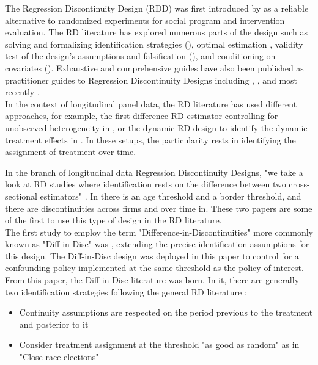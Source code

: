\documentclass[12pt]{article}
\theoremstyle{plain}
\theoremstyle{remark}
\begin{document}
The Regression Discontinuity Design (RDD) was first introduced by \textcite{Thistlewaite1960} as a reliable alternative to randomized experiments for social program and intervention evaluation. The RD literature has explored numerous parts of the design such as solving and formalizing identification strategies (\cite{Hahn2001}), optimal estimation \parencite{Porter2003}, validity test of the design's assumptions and falsification (\cite{McCrary2008}), and conditioning on covariates (\cite{Frolich2007}). Exhaustive and comprehensive guides have also been published as practitioner guides to Regression Discontinuity Designs including \textcite{Imbens2008}, \textcite{VanDerKlaauw2008}, \textcite{Lee2010} and most recently \textcite{Cattaneo2020}.\\

In the context of longitudinal panel data, the RD literature has used different approaches, for example, the first-difference RD estimator controlling for unobserved heterogeneity in \textcite{lemieux2008incentives}, or the dynamic RD design to identify the dynamic treatment effects in \textcite{cellini2010voter}. In these setups, the particularity rests in identifying the assignment of treatment over time.

In the branch of longitudinal data Regression Discontinuity Designs, "we take a look at RD studies where identification rests on the difference between two cross-sectional estimators" \parencite{grembi2016do}. 
In \textcite{lalive2008wage} there is an age threshold and a border threshold, and there are discontinuities across firms and over time in\textcite{leonardi2013product}. These two papers are some of the first to use this type of design in the RD literature.
\\
The first study to employ the term "Difference-in-Discontinuities" more commonly known as "Diff-in-Disc" was \textcite{grembi2016do}, extending the precise identification assumptions for this design. The Diff-in-Disc design was deployed in this paper to control for a confounding policy implemented at the same threshold as the policy of interest. From this paper, the Diff-in-Disc literature was born. In it, there are generally two identification strategies following the general RD literature : 
\begin{itemize}
    \item Continuity assumptions are respected on the period previous to the treatment and posterior to it \parencite{baskaran2016electoral, lippmann2018politiques}
    \item Consider treatment assignment at the threshold "as good as random" as in "Close race elections" \parencite{chicoine2017homicides, bhalotra2018pathbreakers}
\end{itemize}
\end{document}
